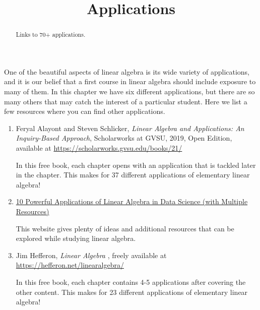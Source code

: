 \documentclass{ximera}
\title{Applications} \license{CC BY-NC-SA 4.0}
\begin{document}
\begin{abstract}
Links to 70+ applications.
\end{abstract}
\maketitle
 
One of the beautiful aspects of linear algebra is its wide variety of applications, and it is our belief that a first course in linear algebra should include exposure to many of them.  In this chapter we have six different applications, but there are so many others that may catch the interest of a particular student.  Here we list a few resources where you can find other applications.

\begin{enumerate}
    \item Feryal Alayont and Steven Schlicker, {\it  Linear Algebra and Applications: An Inquiry-Based Approach}, Scholarworks at GVSU, 2019, Open Edition, available at \href{https://scholarworks.gvsu.edu/books/21/}{https://scholarworks.gvsu.edu/books/21/}

    In this free book, each chapter opens with an application that is tackled later in the chapter.  This makes for 37 different applications of elementary linear algebra!

    \item \href{https://www.analyticsvidhya.com/blog/2019/07/10-applications-linear-algebra-data-science/}{10 Powerful Applications of Linear Algebra in Data Science (with Multiple Resources)}

    This website gives plenty of ideas and additional resources that can be explored while studying linear algebra.

    \item
    Jim Hefferon, {\it  Linear Algebra }, freely available at \href{https://hefferon.net/linearalgebra/}{https://hefferon.net/linearalgebra/}

    In this free book, each chapter contains 4-5 applications after covering the other content.  This makes for 23 different applications of elementary linear algebra!

\end{enumerate}





 
\end{document}
